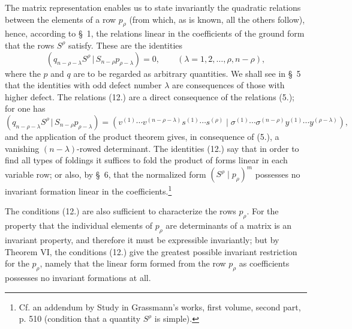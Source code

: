 \documentclass[11pt]{article}
\newcommand{\pair}[2]{(#1\,|\,#2)}
\begin{document}
The matrix representation enables us to state invariantly the quadratic relations between the elements of a row $p_\rho$ (from which, as is known, all the others follow), hence, according to \S\ 1, the relations linear in the coefficients of the ground form that the rows $S^\rho$ satisfy. These are the identities
\begin{equation}
 \pair{q_{n-\rho-\lambda}S^\rho}{S_{n-\rho}p_{\rho-\lambda}}=0,
 \qquad (\lambda=1,2,\ldots,\rho,n-\rho),
\tag{12}
\end{equation}
where the $p$ and $q$ are to be regarded as arbitrary quantities. We shall see in \S\ 5 that the identities with odd defect number $\lambda$ are consequences of those with higher defect. The relations (12.) are a direct consequence of the relations (5.); for one has
\[
 \pair{q_{n-\rho-\lambda}S^\rho}{S_{n-\rho}p_{\rho-\lambda}}
 =(v^{(1)}\cdots v^{(n-\rho-\lambda)}s^{(1)}\cdots s^{(\rho)}\mid \sigma^{(1)}\cdots\sigma^{(n-\rho)}y^{(1)}\cdots y^{(\rho-\lambda)}),
\]
and the application of the product theorem gives, in consequence of (5.), a vanishing $(n-\lambda)$-rowed determinant. The identities (12.) say that in order to find all types of foldings it suffices to fold the product of forms linear in each variable row; or also, by \S\ 6, that the normalized form $(S^\rho\mid p_\rho)^m$ possesses no invariant formation linear in the coefficients.\footnote{Cf. an addendum by Study in Grassmann's works, first volume, second part, p. 510 (condition that a quantity $S^\rho$ is simple).}

The conditions (12.) are also sufficient to characterize the rows $p_\rho$. For the property that the individual elements of $p_\rho$ are determinants of a matrix is an invariant property, and therefore it must be expressible invariantly; but by Theorem VI, the conditions (12.) give the greatest possible invariant restriction for the $p_\rho$, namely that the linear form formed from the row $p_\rho$ as coefficients possesses no invariant formations at all.
\end{document}
